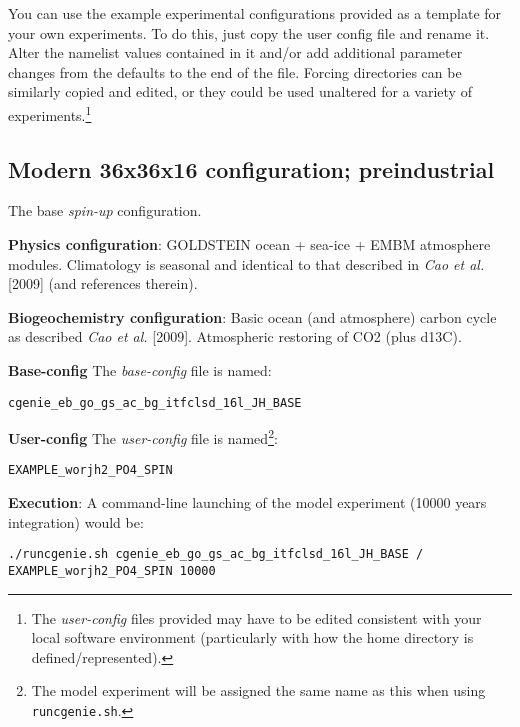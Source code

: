 \documentclass[10pt,twoside]{article}
\begin{document}
\noindent You can use the example experimental configurations provided as a template for your own experiments. To do this, just copy the user config file and rename it. Alter the namelist values contained in it and/or add additional parameter changes from the defaults to the end of the file. Forcing directories can be similarly copied and edited, or they could be used unaltered for a variety of experiments.\footnote{The \textit{user-config} files provided may have to be edited consistent with your local software environment (particularly with how the home directory is defined/represented).}
	


\subsection{Modern 36x36x16 configuration; preindustrial}\label{EXAMPLE_worjh2_PO4_SPIN}

The base \textit{spin-up} configuration.

\noindent \textbf{Physics configuration}: GOLDSTEIN ocean + sea-ice + EMBM atmosphere modules. Climatology is seasonal and identical to that described in \textit{Cao et al.} [2009] (and references therein).

\noindent \textbf{Biogeochemistry configuration}: Basic ocean (and atmosphere) carbon cycle as described \textit{Cao et al.} [2009]. Atmospheric restoring of CO2 (plus d13C).

\noindent \textbf{Base-config} The \textit{base-config} file is named:
\vspace{-10pt}\begin{verbatim}cgenie_eb_go_gs_ac_bg_itfclsd_16l_JH_BASE\end{verbatim}\vspace{-10pt}

\noindent \textbf{User-config} The \textit{user-config} file is named\footnote{The model experiment will be assigned the same name as this when using \texttt{runcgenie.sh}.}:
\vspace{-10pt}\begin{verbatim}EXAMPLE_worjh2_PO4_SPIN\end{verbatim}\vspace{-10pt}

\noindent \textbf{Execution}: A command-line launching of the model experiment (10000 years integration) would be:
\vspace{-10pt}\begin{verbatim}./runcgenie.sh cgenie_eb_go_gs_ac_bg_itfclsd_16l_JH_BASE /
EXAMPLE_worjh2_PO4_SPIN 10000\end{verbatim}\vspace{-5pt}
\end{document}
